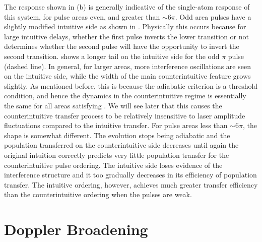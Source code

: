 The response shown in (b) is generally indicative of the
single-atom response of this system, for pulse areas even, and greater than
$\sim 6\pi$. Odd area pulses have a slightly modified intuitive side as shown
in .  Physically this occurs because for large intuitive delays,
whether the first pulse inverts the lower transition or not determines whether
the second pulse will have the opportunity to invert the second
transition.   shows a longer tail on the intuitive side for the
odd $\pi$ pulse (dashed line).  In general, for larger areas, more interference
oscillations are seen on the intuitive side, while the width of the main
counterintuitive feature grows slightly.  As mentioned before, this is because
the adiabatic criterion is a threshold condition, and hence the dynamics in the
counterintuitive regime is essentially the same for all areas satisfying
.  We will see later that this causes the counterintuitive
transfer process to be relatively insensitive to laser amplitude fluctuations
compared to the intuitive transfer.  For pulse areas less than $\sim 6\pi$, the
shape is somewhat different.  The evolution stops being adiabatic and the
population transferred on the counterintuitive side decreases until again the
original intuition correctly predicts very little population transfer for the
counterintuitive pulse ordering.  The intuitive side loses evidence of the
interference structure and it too gradually decreases in its efficiency of
population transfer.  The intuitive ordering, however, achieves much greater
transfer efficiency than the counterintuitive ordering when the pulses are weak.

\section{Doppler Broadening}

